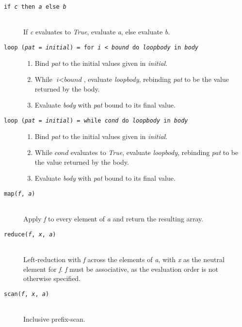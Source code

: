\documentclass[oneside]{memoir}
\begin{document}
\begin{description}
  \item[\texttt{if \textit{c} then \textit{a} else \textit{b}}]\hfill\\
    If \textit{c} evaluates to \textit{True}, evaluate \textit{a},
    else evaluate \textit{b}.

  \item[\texttt{loop (\textit{pat} = \textit{initial}) = for \textit{i} < \textit{bound} do \textit{loopbody} in \textit{body}}]\hfill
    \begin{enumerate}
    \item Bind \textit{pat} to the initial values given in \textit{initial}.
    \item While $\textit{i} < \textit{bound}$, evaluate \textit{loopbody},
      rebinding \textit{pat} to be the value returned by the body.
    \item Evaluate \textit{body} with \textit{pat} bound to its final
      value.
    \end{enumerate}

  \item[\texttt{loop (\textit{pat} = \textit{initial}) = while \textit{cond} do \textit{loopbody} in \textit{body}}]\hfill
    \begin{enumerate}
    \item Bind \textit{pat} to the initial values given in \textit{initial}.
    \item While $\textit{cond}$ evaluates to \textit{True}, evaluate
      \textit{loopbody}, rebinding \textit{pat} to be the value
      returned by the body.
    \item Evaluate \textit{body} with \textit{pat} bound to its final
      value.
    \end{enumerate}

  \item[\texttt{map(\textit{f}, \textit{a})}]\hfill\\
    Apply \textit{f} to every element of \textit{a} and return the resulting array.

  \item[\texttt{reduce(\textit{f}, \textit{x}, \textit{a})}]\hfill\\
    Left-reduction with \textit{f} across the elements of \textit{a},
    with \textit{x} as the neutral element for \textit{f}.  \textit{f}
    must be associative, as the evaluation order is not otherwise
    specified.

  \item[\texttt{scan(\textit{f}, \textit{x}, \textit{a})}]\hfill\\
    Inclusive prefix-scan.


\end{description}
\end{document}
